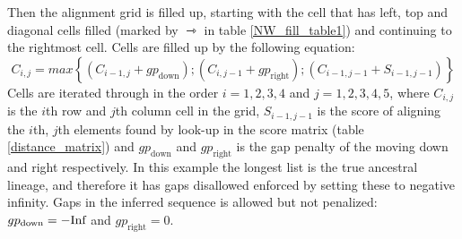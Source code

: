 Then the alignment grid is filled up, starting with the cell that has left, top and diagonal cells filled (marked by $\rightarrowtriangle$ in table \ref{NW_fill_table1}) and continuing to the rightmost cell.
Cells are filled up by the following equation:
$$
C_{i,j} = max\left\{ (C_{i-1,j} + gp_{\text{down}}); (C_{i,j-1} + gp_{\text{right}}); (C_{i-1,j-1} + S_{i-1,j-1})  \right\}
$$
Cells are iterated through in the order $i=1,2,3,4$ and $j=1,2,3,4,5$, where $C_{i,j}$ is the $i$th row and $j$th column cell in the grid, $S_{i-1,j-1}$ is the score of aligning the $i$th, $j$th elements found by look-up in the score matrix (table \ref{distance_matrix}) and $gp_{\text{down}}$ and $gp_{\text{right}}$ is the gap penalty of the moving down and right respectively.
In this example the longest list is the true ancestral lineage, and therefore it has gaps disallowed enforced by setting these to negative infinity.
Gaps in the inferred sequence is allowed but not penalized: $gp_{\text{down}} = -\text{Inf}$ and $gp_{\text{right}} = 0$.


